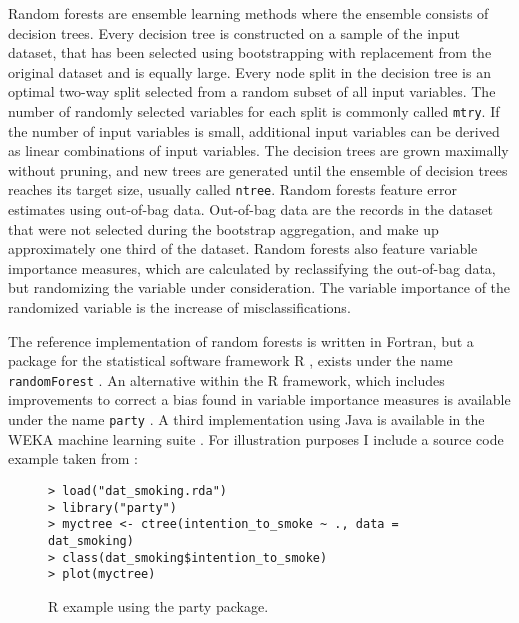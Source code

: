\documentclass[a4paper,man,12pt,apacite,floatsintext,draftfirst]{apa6} %
\begin{document}
Random forests are ensemble learning methods where the ensemble consists
of decision trees.
Every decision tree is constructed on a sample of the input dataset,
that has been selected using bootstrapping with replacement from the original
dataset and is equally large.
Every node split in the decision tree is an optimal two-way split selected
from a random subset of all input variables.
The number of randomly selected variables for each split is commonly called
\texttt{mtry}.
If the number of input variables is small, additional input variables can be
derived as linear combinations of input variables.
The decision trees are grown maximally without pruning,
and new trees are generated until the ensemble of decision trees reaches its
target size, usually called \texttt{ntree}.
Random forests feature error estimates using out-of-bag data.
Out-of-bag data are the records in the dataset that were not selected during
the bootstrap aggregation, and make up approximately one third of the dataset.
Random forests also feature variable importance measures,
which are calculated by reclassifying the out-of-bag data,
but randomizing the variable under consideration.
The variable importance of the randomized variable is the increase of
misclassifications.

The reference implementation of random forests is written in Fortran,
but a package for the statistical software framework R \cite{rproject2012},
exists under the name \texttt{randomForest} \cite{liaw2002classification}.
An alternative within the R framework, which includes improvements
to correct a bias found in variable
importance measures is available under the name \texttt{party}
\cite{strobl2008conditional}.
A third implementation using Java is available in the WEKA machine learning
suite \cite{hall2009weka}.
For illustration purposes I include a source code example taken from
\cite{strobl2008conditional}:

\begin{figure}[H]
\caption{R example using the party package.}
\begin{verbatim}
> load("dat_smoking.rda")
> library("party")
> myctree <- ctree(intention_to_smoke ~ ., data = dat_smoking)
> class(dat_smoking$intention_to_smoke)
> plot(myctree)
\end{verbatim}
\end{figure}
\end{document}
